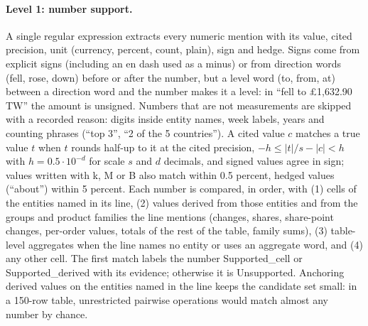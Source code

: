 \documentclass[11pt]{article}
\begin{document}
\paragraph{Level 1: number support.} A single regular expression extracts every numeric mention with its value, cited precision, unit (currency, percent, count, plain), sign and hedge. Signs come from explicit signs (including an en dash used as a minus) or from direction words (fell, rose, down) before or after the number, but a level word (to, from, at) between a direction word and the number makes it a level: in ``fell to \pounds1,632.90 TW'' the amount is unsigned. Numbers that are not measurements are skipped with a recorded reason: digits inside entity names, week labels, years and counting phrases (``top 3'', ``2 of the 5 countries''). A cited value $c$ matches a true value $t$ when $t$ rounds half-up to it at the cited precision, $-h \le |t|/s - |c| < h$ with $h = 0.5 \cdot 10^{-d}$ for scale $s$ and $d$ decimals, and signed values agree in sign; values written with k, M or B also match within 0.5 percent, hedged values (``about'') within 5 percent. Each number is compared, in order, with (1) cells of the entities named in its line, (2) values derived from those entities and from the groups and product families the line mentions (changes, shares, share-point changes, per-order values, totals of the rest of the table, family sums), (3) table-level aggregates when the line names no entity or uses an aggregate word, and (4) any other cell. The first match labels the number Supported\_cell or Supported\_derived with its evidence; otherwise it is Unsupported. Anchoring derived values on the entities named in the line keeps the candidate set small: in a 150-row table, unrestricted pairwise operations would match almost any number by chance.
\end{document}
